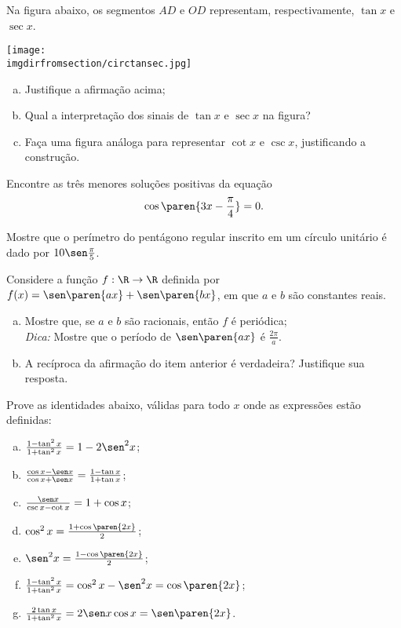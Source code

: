 \begin{exercise}
    Na figura abaixo, os segmentos $AD$ e $OD$ representam,
respectivamente, $\tan x$ e $\sec x$.
\begin{center}
\texttt{[image: \\imgdirfromsection/circtansec.jpg]}
\end{center}
\begin{enumerate}[(a)]
  \item Justifique a afirmação acima;
  \item Qual a interpretação dos sinais de $\tan x$ e $\sec x$ na
  figura?
  \item Faça uma figura análoga para representar $\cot x$ e $\csc
  x$, justificando a construção.
\end{enumerate}
\end{exercise}

\begin{exercise}
    Encontre as três menores soluções positivas da equação $$\cos
\paren{3x - \frac {\pi} 4} = 0.$$
\end{exercise}

\begin{exercise}
    Mostre que o perímetro do pentágono regular inscrito em um
círculo unitário é dado por $10\sen \frac {\pi} 5$.
\end{exercise}

\begin{exercise}
    Considere a função $f: \R \to \R$ definida por $f(x) = \sen
\paren{ax}+\sen \paren{bx}$, em que $a$ e $b$ são constantes reais.
\begin{enumerate}[(a)]
  \item Mostre que, se $a$ e $b$ são racionais, então $f$ é
  periódica;\\
  \emph{Dica:} Mostre que o período de $\sen \paren{ax}$ é $\frac
  {2\pi} a$.
  \item A recíproca da afirmação do item anterior é verdadeira?
  Justifique sua resposta.
\end{enumerate}
\end{exercise}

\begin{exercise}
    Prove as identidades abaixo, válidas para todo $x$ onde as
expressões estão definidas:
\begin{enumerate}[(a)]
  \item $\frac{1-\tan^2 x}{1+\tan^2 x} = 1 - 2\sen^2 x$;
  \item $\frac{\cos x - \sen x}{\cos x + \sen x} = \frac{1 - \tan x}{1+\tan
  x}$;
  \item $\frac{\sen x}{\csc x - \cot x} = 1+ \cos x$;
  \item $\cos^2 x = \frac {1+\cos \paren{2x}} 2$;
  \item $\sen^2 x = \frac {1-\cos \paren{2x}} 2$;
  \item $\frac{1-\tan^2 x}{1+\tan^2 x} = \cos^2 x - \sen^2 x = \cos \paren{2x}$;
  \item $\frac{2\tan x}{1+\tan^2 x} = 2\sen x \cos x= \sen\paren{2x}$.
\end{enumerate}
\end{exercise}

